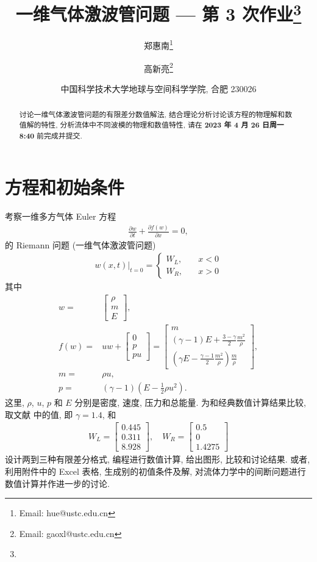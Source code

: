 \documentclass[10.5pt
]{article}
\title{一维气体激波管问题 --- 第 3 次作业\footnote{\Term\Course}}
\author{
  郑惠南\footnote{Email: hue@ustc.edu.cn}
  \and
  高新亮\footnote{Email: gaoxl@ustc.edu.cn}
}
\date{%
\scriptsize%
中国科学技术大学地球与空间科学学院, 合肥 230026
%
}
\def\due{2023 年 4 月 26 日周一 8:40}
\begin{document}
\maketitle

\begin{abstract}
讨论一维气体激波管问题的有限差分数值解法, 结合理论分析讨论该方程的物理解和数值解的特性,
分析流体中不同波模的物理和数值特性, 请在 \textbf{\due} 前完成并提交. 

\end{abstract}

\section{方程和初始条件}
考察一维多方气体 Euler 方程 \citep{Jeffrey1964}
\begin{align}
\frac{\partial w}{\partial t} + \frac{\partial f(w)}{\partial
x}= 0,\label{Eqn:Euler}
\end{align}
的 Riemann 问题 (一维气体激波管问题)
\begin{align}
w(x,t)|_{t=0} = \left\{ \begin{array}{ll}
W_L, & \quad x < 0 \\
W_R, & \quad x > 0
\end{array} \right.
\end{align}
其中
\begin{align}
w =& \left[\begin{array}{c}
\rho\\
m\\
E
\end{array}\right],
\\
f(w) =& u w + \left[\begin{array}{c}
0\\
p\\
p u
\end{array}\right] = \left[\begin{array}{c}
m
\\
(\gamma - 1) E + \frac{3 - \gamma}{2} \frac{m^2}{\rho}
\\
(\gamma E - \frac{\gamma - 1}{2} \frac{m^2}{\rho}) \frac{m}{\rho}
\end{array}\right],
\\
m =& \rho u,
\\
p =& (\gamma - 1)(E - \frac{1}{2} \rho u^2).
\end{align}
这里, $\rho$, $u$, $p$ 和 $E$ 分别是密度, 速度, 压力和总能量. 为和经典数值计算结果比较, 取文献 \citet{Harten1983} 中的值, 即 $\gamma=1.4$, 和
\begin{align}
    W_L = \left[\begin{array}{l}
    0.445\\
    0.311\\
    8.928
    \end{array}\right], \quad W_R = \left[\begin{array}{l}
    0.5\\
    0\\
    1.4275
    \end{array}\right]
\end{align}
设计两到三种有限差分格式, 编程进行数值计算, 给出图形, 比较和讨论结果. 或者, 利用附件中的 Excel 表格, 生成别的初值条件及解, 对流体力学中的间断问题进行数值计算并作进一步的讨论.
\end{document}
